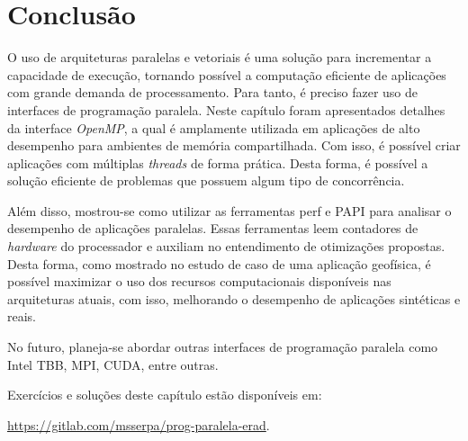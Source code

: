 \section{Conclusão} \label{sec:conclusion}

O uso de arquiteturas paralelas e vetoriais é uma solução para incrementar a capacidade de execução, tornando possível a computação eficiente de aplicações com grande demanda de processamento. Para tanto, é preciso fazer uso de interfaces de programação paralela. Neste capítulo foram apresentados detalhes da interface \emph{OpenMP}, a qual é amplamente utilizada em aplicações de alto desempenho para ambientes de memória compartilhada. Com isso, é possível criar aplicações com múltiplas \emph{threads} de forma prática. Desta forma, é possível a solução eficiente de problemas que possuem algum tipo de concorrência. 

Além disso, mostrou-se como utilizar as ferramentas perf e PAPI para analisar o desempenho de aplicações paralelas. Essas ferramentas leem contadores de \textit{hardware} do processador e auxiliam no entendimento de otimizações propostas. Desta forma, como mostrado no estudo de caso de uma aplicação geofísica, é possível maximizar o uso dos recursos computacionais disponíveis nas arquiteturas atuais, com isso, melhorando o desempenho de aplicações sintéticas e reais.

No futuro, planeja-se abordar outras interfaces de programação paralela como Intel TBB, MPI, CUDA, entre outras.

Exercícios e soluções deste capítulo estão disponíveis em:

\url{https://gitlab.com/msserpa/prog-paralela-erad}.
